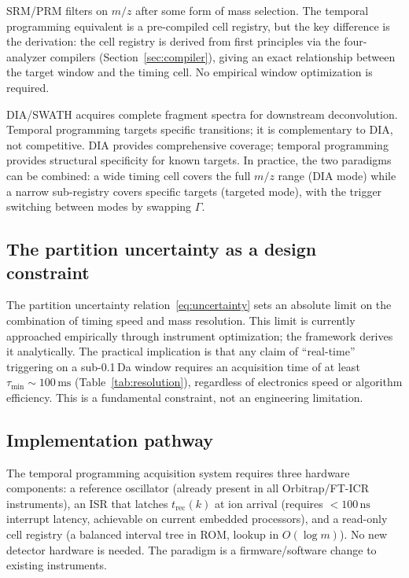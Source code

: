 \documentclass[twocolumn,10pt,a4paper]{article}
\theoremstyle{thmstyle}
\theoremstyle{definition}
\theoremstyle{remark}
\newcommand{\trec}{t_{\mathrm{rec}}}
\begin{document}
SRM/PRM filters on $m/z$ after some form of mass selection. The
temporal programming equivalent is a pre-compiled cell registry,
but the key difference is the derivation: the cell registry is derived
from first principles via the four-analyzer compilers
(Section~\ref{sec:compiler}), giving an exact relationship between the
target window and the timing cell. No empirical window optimization
is required.

DIA/SWATH acquires complete fragment spectra for downstream
deconvolution. Temporal programming targets specific transitions;
it is complementary to DIA, not competitive. DIA provides comprehensive
coverage; temporal programming provides structural specificity for
known targets. In practice, the two paradigms can be combined:
a wide timing cell covers the full $m/z$ range (DIA mode) while a
narrow sub-registry covers specific targets (targeted mode),
with the trigger switching between modes by swapping $\Gamma$.

\subsection{The partition uncertainty as a design constraint}

The partition uncertainty relation~\eqref{eq:uncertainty} sets an
absolute limit on the combination of timing speed and mass resolution.
This limit is currently approached empirically through instrument
optimization; the framework derives it analytically. The practical
implication is that any claim of ``real-time'' triggering on a
sub-0.1\,Da window requires an acquisition time of at least
$\tau_{\min} \sim 100\,\mathrm{ms}$ (Table~\ref{tab:resolution}),
regardless of electronics speed or algorithm efficiency. This is a
fundamental constraint, not an engineering limitation.

\subsection{Implementation pathway}

The temporal programming acquisition system requires three hardware
components: a reference oscillator (already present in all
Orbitrap/FT-ICR instruments), an ISR that latches $\trec(k)$ at ion
arrival (requires $<100\,\mathrm{ns}$ interrupt latency, achievable
on current embedded processors), and a read-only cell registry (a
balanced interval tree in ROM, lookup in $O(\log m)$). No new
detector hardware is needed. The paradigm is a firmware/software
change to existing instruments.
\end{document}

